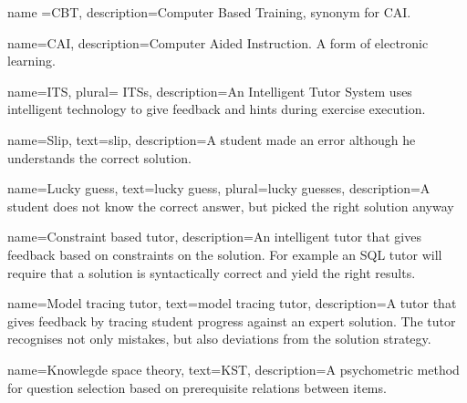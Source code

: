 	{
	name ={CBT},
	description={Computer Based Training, synonym for CAI.}
}

	{
	name={CAI},  
	description={Computer Aided Instruction. A form of electronic learning.}
}

	{
	name={ITS},  
	plural= {ITSs},
	description={An Intelligent Tutor System uses intelligent technology to give feedback and hints during exercise execution.}
}

	{
	name={Slip},  
	text={slip},
	description={A student made an error although he understands the correct solution. }
}

	{
	name={Lucky guess},  
	text={lucky guess},  
	plural={lucky guesses},
	description={A student does not know the correct answer, but picked the right solution anyway}
}

 {
	name={Constraint based tutor},
	description={An intelligent tutor that gives feedback based on constraints on the solution. 
	For example an SQL tutor will require that a solution is syntactically correct and yield the right results.}
}

 {
	name={Model tracing tutor},
	text={model tracing tutor},
	description={A tutor that gives feedback by tracing student progress against an expert solution.
	The tutor recognises not only mistakes, but also deviations from the solution strategy. }
}

 {
	name={Knowlegde space theory},
	text={KST},
	description={A psychometric method for question selection based on prerequisite relations between items. }
}


